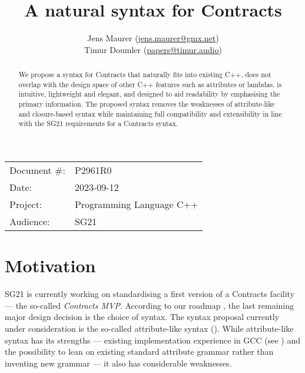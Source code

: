 


\title{A natural syntax for Contracts}
\author{ Jens Maurer \small(\href{mailto:jens.maurer@gmx.net}{jens.maurer@gmx.net}) \\
 Timur Doumler \small(\href{mailto:papers@timur.audio}{papers@timur.audio})}
\date{}
\maketitle

\begin{tabular}{ll}
Document \#: & P2961R0 \\
Date: &2023-09-12 \\
Project: & Programming Language C++ \\
Audience: & SG21
\end{tabular}

\begin{abstract}
We propose a syntax for Contracts that naturally fits into existing C++, does not overlap with the design space of other C++ features such as attributes or lambdas, is intuitive, lightweight and elegant, and designed to aid readability by emphasising the primary information. The proposed syntax removes the weaknesses of attribute-like and closure-based syntax while maintaining full compatibility and extensibility in line with the SG21 requirements for a Contracts syntax.
\end{abstract}

\section{Motivation}
\label{sec:motivation}

SG21 is currently working on standardising a first version of a Contracts facility --- the so-called \emph{Contracts MVP}. According to our roadmap \cite{P2695R1}, the last remaining major design decision is the choice of syntax. The syntax proposal currently under consideration is the so-called attribute-like syntax (\cite{P2935R0}). While attribute-like syntax has its strengths --- existing implementation experience in GCC (see \cite{P1680R0}) and the possibility to lean on existing standard attribute grammar rather than inventing new grammar --- it also has considerable weaknesses.

